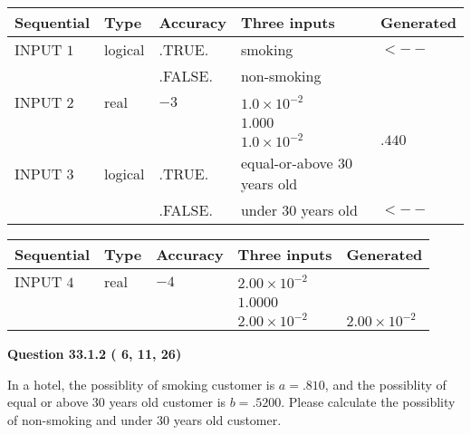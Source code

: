 \documentclass[12pt]{article}
\begin{document}
   
  
  
\noindent\begin{tabular}{|l|l|l|l|l|}
\hline
 Sequential & Type & Accuracy & Three inputs & Generated \\ 
\hline
 
 
  INPUT $           1$ & logical & .TRUE. & 
 smoking & 
  $ <-- $ 
  \\
  & & .FALSE. & 
  non-smoking & 
 \\  \hline  
 
 
  INPUT $           2$ & real & $          -3 $ & $
 1.0 \times 10^{-2}
  $ & \\
  & & &  $
 1.000
  $ & \\
  & & &  $
 1.0 \times 10^{-2}
 $ & $ .440 $ 
 \\  \hline  
 
 
  INPUT $           3$ & logical & .TRUE. & 
 equal-or-above 30 years old & 
  \\
  & & .FALSE. & 
  under 30 years old & 
  $ <-- $ 
 \\  \hline  
 \end{tabular}
   
   
  
  
\noindent\begin{tabular}{|l|l|l|l|l|}
\hline
 Sequential & Type & Accuracy & Three inputs & Generated \\ 
\hline
 
 
  INPUT $           4$ & real & $          -4 $ & $
 2.00 \times 10^{-2}
  $ & \\
  & & &  $
 1.0000
  $ & \\
  & & &  $
 2.00 \times 10^{-2}
 $ & $ 2.00 \times 10^{-2} $ 
 \\  \hline  
 \end{tabular}
   
   
  
\vspace{0.2in}
  
{\textbf{\Large{Question
33.1.2 
 (          6,         11,         26)
}}}
  
  
In a hotel, the possiblity of  %
smoking customer is
$a =  %
.810$, and the possiblity of  %
equal or above 30 years old customer is $ b =  %
.5200$.
Please calculate the possiblity of  %
 non-smoking and  %
under 30 years old customer.
 
 
 
\noindent{}
 
\end{document}
